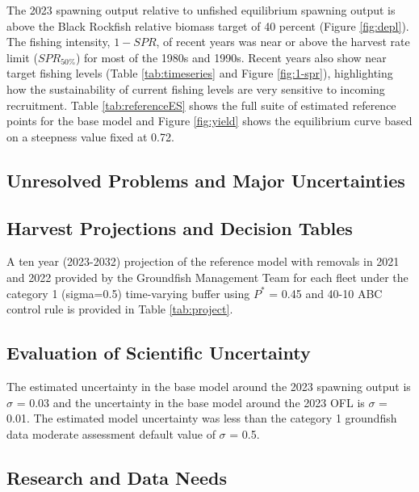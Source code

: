 \documentclass[11pt,
  english,
  letterpaper,
]{article}
\begin{document}
The 2023 spawning output relative to unfished equilibrium spawning output is above the Black Rockfish relative biomass target of 40 percent (Figure \ref{fig:depl}). The fishing intensity, \(1-SPR\), of recent years was near or above the harvest rate limit (\(SPR_{50\%}\)) for most of the 1980s and 1990s. Recent years also show near target fishing levels (Table \ref{tab:timeseries} and Figure \ref{fig:1-spr}), highlighting how the sustainability of current fishing levels are very sensitive to incoming recruitment. Table \ref{tab:referenceES} shows the full suite of estimated reference points for the base model and Figure \ref{fig:yield} shows the equilibrium curve based on a steepness value fixed at 0.72.

\hypertarget{unresolved-problems-and-major-uncertainties-2}{%
\subsection{Unresolved Problems and Major Uncertainties}\label{unresolved-problems-and-major-uncertainties-2}}

\hypertarget{harvest-projections-and-decision-tables}{%
\subsection{Harvest Projections and Decision Tables}\label{harvest-projections-and-decision-tables}}

A ten year (2023-2032) projection of the reference model with removals in 2021 and 2022 provided by the Groundfish Management Team for each fleet under the category 1 (sigma=0.5) time-varying buffer using \(P^*\) = 0.45 and 40-10 ABC control rule is provided in Table \ref{tab:project}.

\hypertarget{evaluation-of-scientific-uncertainty}{%
\subsection{Evaluation of Scientific Uncertainty}\label{evaluation-of-scientific-uncertainty}}

The estimated uncertainty in the base model around the 2023 spawning output is \(\sigma\) = 0.03 and the uncertainty in the base model around the 2023 OFL is \(\sigma\) = 0.01. The estimated model uncertainty was less than the category 1 groundfish data moderate assessment default value of \(\sigma\) = 0.5.

\hypertarget{research-and-data-needs-1}{%
\subsection{Research and Data Needs}\label{research-and-data-needs-1}}
\end{document}
